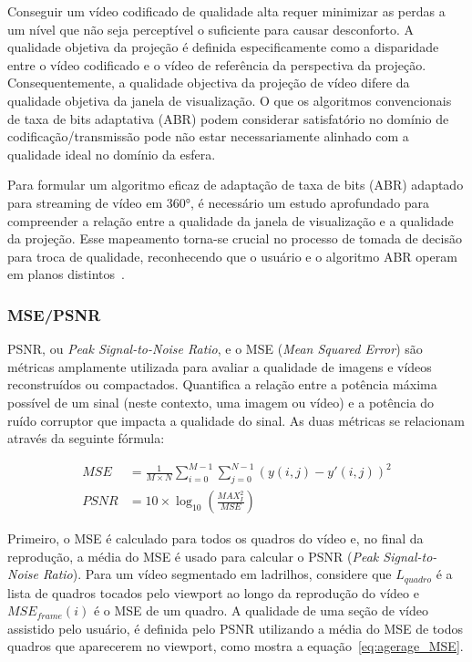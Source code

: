 Conseguir um vídeo codificado de qualidade alta requer minimizar as perdas a um nível que não seja perceptível o suficiente para causar desconforto. A qualidade objetiva da projeção é definida especificamente como a disparidade entre o vídeo codificado e o vídeo de referência da perspectiva da projeção. Consequentemente, a qualidade objectiva da projeção de vídeo difere da qualidade objetiva da janela de visualização. O que os algoritmos convencionais de taxa de bits adaptativa (ABR) podem considerar satisfatório no domínio de codificação/transmissão pode não estar necessariamente alinhado com a qualidade ideal no domínio da esfera.

Para formular um algoritmo eficaz de adaptação de taxa de bits (ABR) adaptado para streaming de vídeo em 360°, é necessário um estudo aprofundado para compreender a relação entre a qualidade da janela de visualização e a qualidade da projeção. Esse mapeamento torna-se crucial no processo de tomada de decisão para troca de qualidade, reconhecendo que o usuário e o algoritmo ABR operam em planos distintos~\cite{tran2017, Xu2020}.

\subsubsection{MSE/PSNR}

PSNR, ou \textit{Peak Signal-to-Noise Ratio}, e o MSE (\textit{Mean Squared Error}) são métricas amplamente utilizada para avaliar a qualidade de imagens e vídeos reconstruídos ou compactados. Quantifica a relação entre a potência máxima possível de um sinal (neste contexto, uma imagem ou vídeo) e a potência do ruído corruptor que impacta a qualidade do sinal. As duas métricas se relacionam através da seguinte fórmula:

\begin{align}
        \label{MSE}
        MSE&= \frac{1}{M\times N}\sum^{M-1}_{i=0}\sum^{N-1}_{j=0} \left(y(i,j) - y'(i,j)\right)^2 \\
        \label{PSNR}
        PSNR&=10 \times \log_{10}\left(\frac{MAX^2_I}{MSE}\right)
\end{align}

Primeiro, o MSE é calculado para todos os quadros do vídeo e, no final da reprodução, a média do MSE é usado para calcular o PSNR (\textit{Peak Signal-to-Noise Ratio}). Para um vídeo segmentado em ladrilhos, considere que $L_{quadro} $ é a lista de quadros tocados pelo viewport ao longo da reprodução do vídeo e $MSE_{frame}(i)$ é o MSE de um quadro. A qualidade de uma seção de vídeo assistido pelo usuário, é definida pelo PSNR utilizando a média do MSE de todos quadros que aparecerem no viewport, como mostra a equação~\ref{eq:agerage_MSE}.

